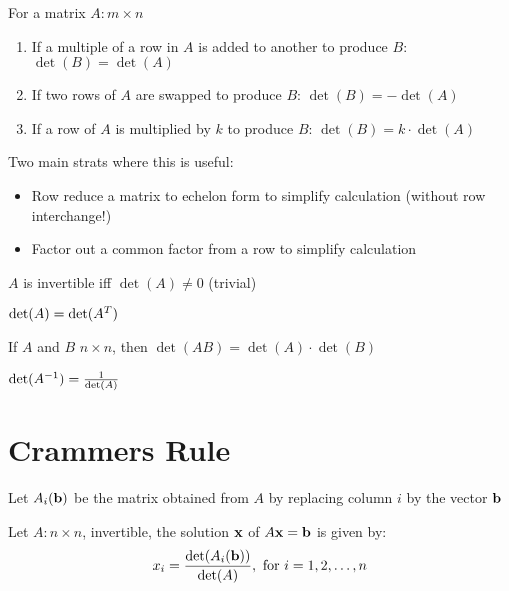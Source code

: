 \documentclass{report}
\begin{document}
\begin{theorem}\end{theorem}
\begin{tcolorbox}[colback=blue!5!white, colframe=blue!75!black, title=Row Operations]
For a matrix $A: m \times n$
\begin{enumerate}[label=\alph*.]
    \item If a multiple of a row in $A$ is added to another to produce $B$: $\det(B) = \det(A)$
    \item If two rows of $A$ are swapped to produce $B$: $\det(B) = -\det(A)$
    \item If a row of $A$ is multiplied by $k$ to produce $B$: $\det(B) = k \cdot \det(A)$
\end{enumerate}
\end{tcolorbox}
Two main strats where this is useful:
\begin{itemize}
    \item Row reduce a matrix to echelon form to simplify calculation (without row interchange!)
    \item Factor out a common factor from a row to simplify calculation 
\end{itemize}

\begin{theorem}
    $A$ is invertible iff $\det(A) \ne 0$ (trivial)
\end{theorem}

\begin{theorem}
    $\det(A) = \det(A^{T})$
\end{theorem}

\begin{theorem}
    If $A$ and $B$ $n \times n$, then $\det(AB) = \det(A) \cdot \det(B)$
\end{theorem}

\begin{lemma}
    $\det(A^{-1}) = \frac{1}{\det(A)}$
\end{lemma}

\section{Crammers Rule}
Let $A_i(\mathbf{b})$ be the matrix obtained from $A$ by replacing column $i$ by the vector $\mathbf{b}$

\begin{theorem}
    Let $A: n \times n$, invertible, the solution $\mathbf{x}$ of $A\mathbf{x} = \mathbf{b}$ is given by: \[
    x_i = \frac{\det(A_i(\mathbf{b}))}{\det(A)}, \text{   for }i = 1, 2, \ldots, n
    \]
\end{theorem}
\end{document}
